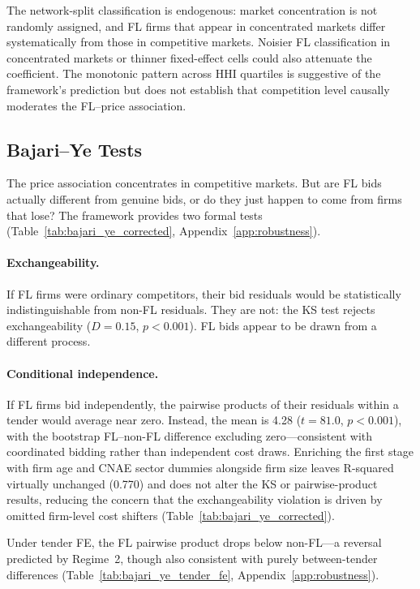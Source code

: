 The network-split classification is endogenous: market concentration
is not randomly assigned, and FL firms that appear in concentrated
markets differ systematically from those in competitive markets.
Noisier FL classification in concentrated markets or thinner
fixed-effect cells could also attenuate the coefficient. The
monotonic pattern across HHI quartiles is suggestive of the
framework's prediction but does not establish that competition level
causally moderates the FL--price association.



\subsection{Bajari--Ye Tests}
\label{sec:results_bajari}

The price association concentrates in competitive markets. But are
FL bids actually different from genuine bids, or do they just happen
to come from firms that lose? The \citet{bajari2003deciding}
framework provides two formal tests
(Table~\ref{tab:bajari_ye_corrected}, Appendix~\ref{app:robustness}).

\paragraph{Exchangeability.}
If FL firms were ordinary competitors, their bid residuals would be
statistically indistinguishable from non-FL residuals. They are not:
the KS test rejects exchangeability ($D = 0.15$, $p < 0.001$). FL
bids appear to be drawn from a different process.

\paragraph{Conditional independence.}
If FL firms bid independently, the pairwise products of their
residuals within a tender would average near zero. Instead, the mean
is 4.28 ($t = 81.0$, $p < 0.001$), with the bootstrap FL--non-FL
difference excluding zero---consistent with coordinated bidding
rather than independent cost draws. Enriching the
first stage with firm age and CNAE sector dummies alongside firm
size leaves R-squared virtually unchanged (0.770) and does not
alter the KS or pairwise-product results, reducing the concern
that the exchangeability violation is driven by omitted firm-level
cost shifters (Table~\ref{tab:bajari_ye_corrected}).

Under tender FE, the FL pairwise product drops below non-FL---a
reversal predicted by Regime~2, though also consistent with purely
between-tender differences (Table~\ref{tab:bajari_ye_tender_fe},
Appendix~\ref{app:robustness}).

